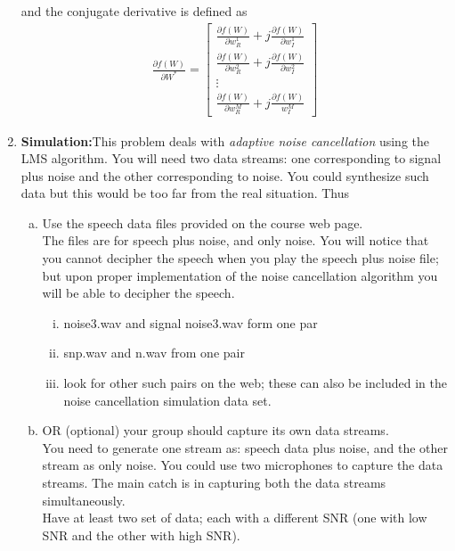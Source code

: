 \documentclass[journal,12pt,twocolumn]{IEEEtran}
\begin{document}
\begin{enumerate}
and the conjugate derivative is defined as\\
\begin{align*}
\frac{\partial{f(W)}}{\partial{W}^{*}}=\begin{bmatrix}{\frac{\partial{f(W)}}{\partial{w}_R^1}}+{j\frac{\partial{f(W)}}{\partial{w}_I^1}} \\[12pt]
{\frac{\partial{f(W)}}{\partial{w}_R^2}}+{j\frac{\partial{f(W)}}{\partial{w}_I^2}} \\
\vdots \\
{\frac{\partial{f(W)}}{\partial{w}_R^M}}+{j\frac{\partial{f(W)}}{{w}_I^M}}
\end{bmatrix}
\end{align*}
\bigskip
\item \textbf{Simulation:}This problem deals with \textit{adaptive noise cancellation} using the LMS algorithm. You will need two data streams: one corresponding to signal plus noise and the other corresponding to noise. You could synthesize such
data but this would be too far from the real situation. Thus
\medskip
\begin{enumerate}[(a)]
\item Use the speech data files provided on the course web page.\\
\smallskip
The files are for speech plus noise, and only noise. You will notice that you cannot decipher the speech when you play the speech plus noise file; but upon proper implementation of the noise cancellation algorithm you will be able to decipher the speech.
\begin{enumerate}[i.]
\medskip
\item noise3.wav and signal noise3.wav form one par
\item snp.wav and n.wav from one pair
\item look for other such pairs on the web; these can also be included in the noise cancellation simulation data
set.
\end{enumerate}
\bigskip
\item OR (optional) your group should capture its own data streams.\\
You need to generate one stream as: speech data plus noise, and the other stream as only noise. You could
use two microphones to capture the data streams. The main catch is in capturing both the data streams simultaneously.\\
Have at least two set of data; each with a different SNR (one with low SNR and the other with high SNR).
\end{enumerate}
\end{enumerate}
\end{document}
